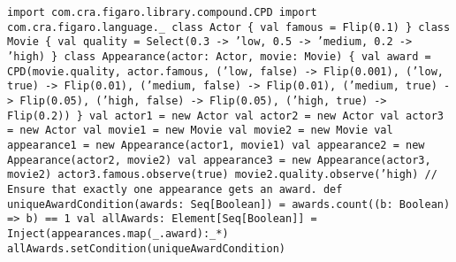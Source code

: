 \begin{flushleft}
\texttt{import com.cra.figaro.library.compound.CPD
\newline import com.cra.figaro.language.\_
\newline
\newline class Actor \{
\newline \tab val famous = Flip(0.1)
\newline \}
\newline
\newline class Movie \{
\newline \tab val quality = Select(0.3 -> 'low, 0.5 -> 'medium, 0.2 -> 'high)
\newline \}
\newline
{}
\newline class Appearance(actor: Actor, movie: Movie) \{
\newline \tab val award = CPD(movie.quality, actor.famous, 
\newline \tab  \tab ('low, false) -> Flip(0.001), 
\newline \tab \tab ('low, true) -> Flip(0.01), 
\newline \tab \tab ('medium, false) -> Flip(0.01), 
\newline \tab \tab ('medium, true) -> Flip(0.05), 
\newline \tab \tab ('high, false) -> Flip(0.05), 
\newline \tab \tab ('high, true) -> Flip(0.2))
\newline \}
\newline
\newline val actor1 = new Actor 
\newline val actor2 = new Actor 
\newline val actor3 = new Actor 
\newline val movie1 = new Movie 
\newline val movie2 = new Movie
val appearance1 = new Appearance(actor1, movie1) 
\newline val appearance2 = new Appearance(actor2, movie2) 
\newline val appearance3 = new Appearance(actor3, movie2) 
\newline actor3.famous.observe(true) 
\newline movie2.quality.observe('high)
\newline 
{}
\newline // Ensure that exactly one appearance gets an award. 
\newline def uniqueAwardCondition(awards: Seq[Boolean]) =
\newline \tab awards.count((b: Boolean) => b) == 1
\newline val allAwards: Element[Seq[Boolean]] = 
\newline \tab Inject(appearances.map(\_.award):\_*)
\newline allAwards.setCondition(uniqueAwardCondition)}
\end{flushleft}

